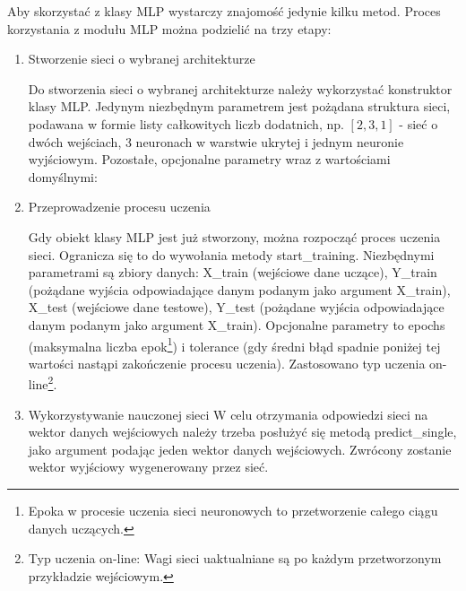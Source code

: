 Aby skorzystać z klasy MLP wystarczy znajomość jedynie kilku metod. Proces korzystania z modułu MLP można podzielić na trzy etapy:
\begin{enumerate}
\item Stworzenie sieci o wybranej architekturze

Do stworzenia sieci o wybranej architekturze należy wykorzystać konstruktor klasy MLP. Jedynym niezbędnym parametrem jest pożądana struktura sieci, podawana w formie listy całkowitych liczb dodatnich, np. $[2, 3, 1]$ - sieć o dwóch wejściach, 3 neuronach w warstwie ukrytej i jednym neuronie wyjściowym. Pozostałe, opcjonalne parametry wraz z wartościami domyślnymi:


\item Przeprowadzenie procesu uczenia

Gdy obiekt klasy MLP jest już stworzony, można rozpocząć proces uczenia sieci. Ogranicza się to do wywołania metody start\_training. Niezbędnymi parametrami są zbiory danych: X\_train (wejściowe dane uczące), Y\_train (pożądane wyjścia odpowiadające danym podanym jako argument X\_train), X\_test (wejściowe dane testowe), Y\_test (pożądane wyjścia odpowiadające danym podanym jako argument X\_train). Opcjonalne parametry to epochs (maksymalna liczba epok\footnote{Epoka w procesie uczenia sieci neuronowych to przetworzenie całego ciągu danych uczących.}) i tolerance (gdy średni błąd spadnie poniżej tej wartości nastąpi zakończenie procesu uczenia). Zastosowano typ uczenia on-line\footnote{Typ uczenia on-line: Wagi sieci uaktualniane są po każdym przetworzonym przykładzie wejściowym. }.

\item Wykorzystywanie nauczonej sieci
W celu otrzymania odpowiedzi sieci na wektor danych wejściowych należy trzeba posłużyć się metodą predict\_single, jako argument podając jeden wektor danych wejściowych. Zwrócony zostanie wektor wyjściowy wygenerowany przez sieć.
\end{enumerate}

